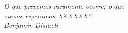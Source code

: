 \begin{epigrafe}
\vspace*{\fill}
\begin{flushright}
\emph{O que prevemos raramente ocorre; o que 
 \\menos esperamos XXXXXX”. 
  \\ Benjamin Disraeli}
\end{flushright}
\end{epigrafe}